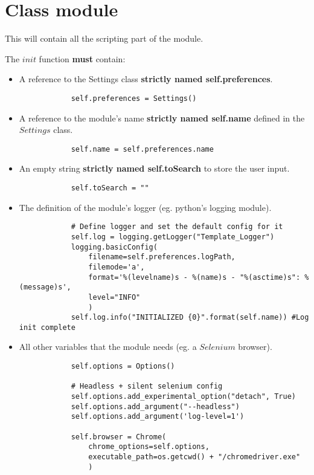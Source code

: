 \documentclass{article}
\begin{document}
\section{Class module} \label{module}
    This will contain all the scripting part of the module.

    The $init$ function \textbf{must} contain:
    \begin{itemize}
        \item A reference to the Settings class \textbf{strictly named self.preferences}.
        \begin{verbatim}
            self.preferences = Settings()
        \end{verbatim}
        \item A reference to the module's name \textbf{strictly named self.name} defined in the $Settings$ class.
        \begin{verbatim}
            self.name = self.preferences.name
        \end{verbatim}
        \item An empty string \textbf{strictly named self.toSearch} to store the user input.
        \begin{verbatim}
            self.toSearch = ""
        \end{verbatim}
        \item The definition of the module's logger (eg. python's logging module).
        \begin{verbatim}
            # Define logger and set the default config for it
            self.log = logging.getLogger("Template_Logger")
            logging.basicConfig(
                filename=self.preferences.logPath,
                filemode='a',
                format='%(levelname)s - %(name)s - "%(asctime)s": %(message)s',
                level="INFO"
                )
            self.log.info("INITIALIZED {0}".format(self.name)) #Log init complete
        \end{verbatim}
        \item All other variables that the module needs (eg. a $Selenium$ browser).
        \begin{verbatim}
            self.options = Options()

            # Headless + silent selenium config
            self.options.add_experimental_option("detach", True)
            self.options.add_argument("--headless")
            self.options.add_argument('log-level=1')

            self.browser = Chrome(
                chrome_options=self.options,
                executable_path=os.getcwd() + "/chromedriver.exe"
                )
        \end{verbatim}


\end{itemize}
\end{document}
